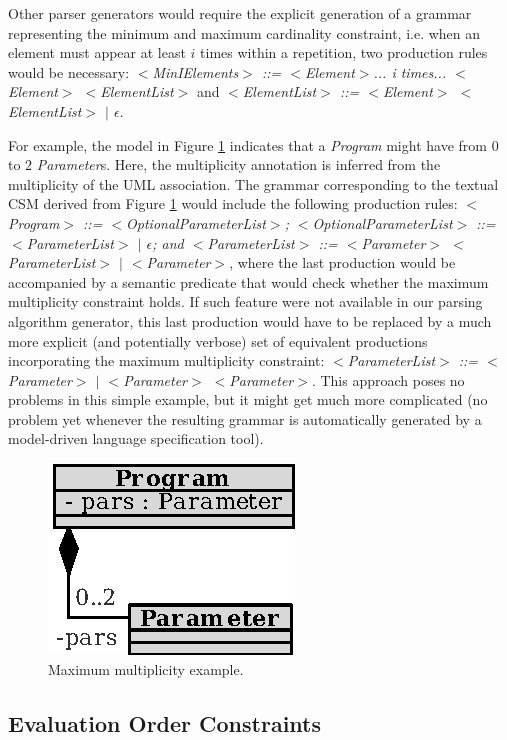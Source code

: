 \documentclass[a4paper,twoside,onecolumn]{article}
\newcommand{\etexttt}[1]{\textit{#1}}
\begin{document}
Other parser generators would require the explicit generation of a grammar representing the minimum and maximum cardinality constraint, i.e. when an element must appear at least $i$ times within a repetition, two production rules would be necessary: \etexttt{$<$MinIElements$>$ ::= $<$Element$>$... i times... $<$Element$>$ $<$ElementList$>$} and \etexttt{$<$ElementList$>$ ::= $<$Element$>$ $<$ElementList$>$ $|$ $\epsilon$}.

For example, the model in Figure \ref{fig:arguments} indicates that a \emph{Program} might have from $0$ to $2$ \emph{Parameter}s.
Here, the multiplicity annotation is inferred from the multiplicity of the UML association.
The grammar corresponding to the textual CSM derived from Figure \ref{fig:arguments} would include the following production rules: \etexttt{$<$Program$>$ ::= $<$OptionalParameterList$>$; $<$OptionalParameterList$>$ ::= $<$ParameterList$>$ $|$ $\epsilon$; and $<$ParameterList$>$ ::= $<$Parameter$>$ $<$ParameterList$>$ $|$ $<$Parameter$>$}, where the last production would be accompanied by a semantic predicate that would check whether the maximum multiplicity constraint holds.
If such feature were not available in our parsing algorithm generator, this last production would have to be replaced by a much more explicit (and potentially verbose) set of equivalent productions incorporating the maximum multiplicity constraint: \etexttt{$<$ParameterList$>$ ::= $<$Parameter$>$ $|$ $<$Parameter$>$ $<$Parameter$>$}.
This approach poses no problems in this simple example, but it might get much more complicated (no problem yet whenever the resulting grammar is automatically generated by a model-driven language specification tool).

\begin{figure}[tb!]
\centering
\includegraphics[scale=1]{arguments.eps}
\caption{Maximum multiplicity example.} \label{fig:arguments}
\end{figure}

\subsection{Evaluation Order Constraints} \label{subsec:evalorder}
\end{document}
